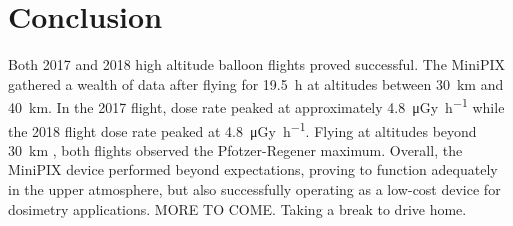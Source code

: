 \section{Conclusion}
\label{Conclusion}
Both 2017 and 2018 high altitude balloon flights proved successful.  
The MiniPIX gathered a wealth of data after flying for \SI{19.5}{\hour} at altitudes between \SI{30}{\kilo\meter} and \SI{40}{\kilo\meter}.  
In the 2017 flight, dose rate peaked at approximately \SI{4.8}{\micro\gray\per\hour} while the 2018 flight dose rate peaked at \SI{4.8}{\micro\gray\per\hour}.  
Flying at altitudes beyond \SI{30}{\kilo\meter} , both flights observed the Pfotzer-Regener maximum.
Overall, the MiniPIX device performed beyond expectations, proving to function adequately in the upper atmosphere, but also successfully operating as a low-cost device for dosimetry applications.
MORE TO COME.  Taking a break to drive home.
